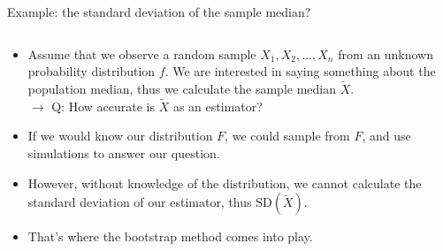 \documentclass[10pt,ignorenonframetext,]{beamer}
\providecommand{\tightlist}{%
  \setlength{\itemsep}{0pt}\setlength{\parskip}{0pt}}
\begin{document}
\begin{frame}

\begin{block}{Example: the standard deviation of the sample median?}

\(~\)

\begin{itemize}
\tightlist
\item
  Assume that we observe a random sample \(X_1, X_2, \ldots, X_n\) from
  an unknown probability distribution \(f\). We are interested in saying
  something about the population median, thus we calculate the sample
  median \(\tilde{X}\).\\
  \(\rightarrow\) Q: How accurate is \(\tilde{X}\) as an estimator?
\end{itemize}

\vspace{2mm}

\begin{itemize}
\tightlist
\item
  If we would know our distribution \(F\), we could sample from \(F\),
  and use simulations to answer our question.
\end{itemize}

\vspace{2mm}

\begin{itemize}
\tightlist
\item
  However, without knowledge of the distribution, we cannot calculate
  the standard deviation of our estimator, thus
  \(\text{SD}(\tilde{X})\).
\end{itemize}

\vspace{2mm}

\begin{itemize}
\tightlist
\item
  That's where the bootstrap method comes into play.
\end{itemize}

\end{block}

\end{frame}
\end{document}
